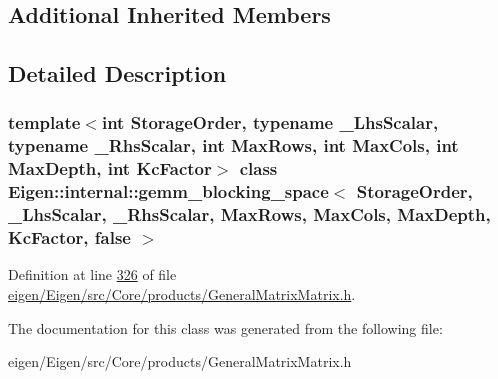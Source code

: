 \subsection*{Additional Inherited Members}


\subsection{Detailed Description}
\subsubsection*{template$<$int Storage\+Order, typename \+\_\+\+Lhs\+Scalar, typename \+\_\+\+Rhs\+Scalar, int Max\+Rows, int Max\+Cols, int Max\+Depth, int Kc\+Factor$>$\newline
class Eigen\+::internal\+::gemm\+\_\+blocking\+\_\+space$<$ Storage\+Order, \+\_\+\+Lhs\+Scalar, \+\_\+\+Rhs\+Scalar, Max\+Rows, Max\+Cols, Max\+Depth, Kc\+Factor, false $>$}



Definition at line \hyperlink{eigen_2_eigen_2src_2_core_2products_2_general_matrix_matrix_8h_source_l00326}{326} of file \hyperlink{eigen_2_eigen_2src_2_core_2products_2_general_matrix_matrix_8h_source}{eigen/\+Eigen/src/\+Core/products/\+General\+Matrix\+Matrix.\+h}.



The documentation for this class was generated from the following file\+:\begin{DoxyCompactItemize}
\item 
eigen/\+Eigen/src/\+Core/products/\+General\+Matrix\+Matrix.\+h\end{DoxyCompactItemize}
